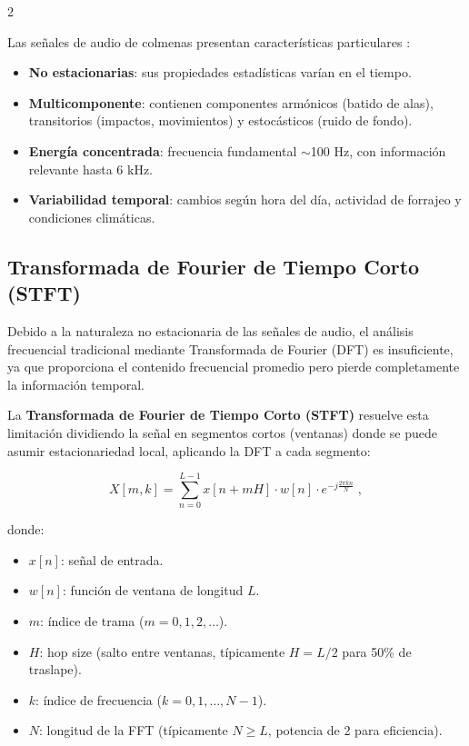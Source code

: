 \documentclass[12pt]{report}
\newenvironment{tightmulticols}{%
  \begin{multicols}{2}
  \setlength{\parskip}{1.2pt}
  \linespread{1}\selectfont
}{%
  \end{multicols}
}
\begin{document}
\begin{tightmulticols}
\noindent Las señales de audio de colmenas presentan características particulares \cite{ruvinga2023}:

\begin{itemize}
    \item \textbf{No estacionarias}: sus propiedades estadísticas varían en el tiempo.
    \item \textbf{Multicomponente}: contienen componentes armónicos (batido de alas), transitorios (impactos, movimientos) y estocásticos (ruido de fondo).
    \item \textbf{Energía concentrada}: frecuencia fundamental $\sim$100 Hz, con información relevante hasta 6 kHz.
    \item \textbf{Variabilidad temporal}: cambios según hora del día, actividad de forrajeo y condiciones climáticas.
\end{itemize}

\subsection{Transformada de Fourier de Tiempo Corto (STFT)}\label{sec:stft}

\noindent Debido a la naturaleza no estacionaria de las señales de audio, el análisis frecuencial tradicional mediante Transformada de Fourier (DFT) es insuficiente, ya que proporciona el contenido frecuencial promedio pero pierde completamente la información temporal.

\par La \textbf{Transformada de Fourier de Tiempo Corto (STFT)} resuelve esta limitación dividiendo la señal en segmentos cortos (ventanas) donde se puede asumir estacionariedad local, aplicando la DFT a cada segmento:

\begin{equation}
    X[m, k] = \sum_{n=0}^{L-1} x[n + mH] \cdot w[n] \cdot e^{-j\frac{2\pi kn}{N}} \; ,
\end{equation}

\noindent donde:
\begin{itemize}
    \item $x[n]$: señal de entrada.
    \item $w[n]$: función de ventana de longitud $L$.
    \item $m$: índice de trama ($m = 0, 1, 2, \ldots$).
    \item $H$: hop size (salto entre ventanas, típicamente $H = L/2$ para 50\% de traslape).
    \item $k$: índice de frecuencia ($k = 0, 1, \ldots, N-1$).
    \item $N$: longitud de la FFT (típicamente $N \geq L$, potencia de 2 para eficiencia).
\end{itemize}


\end{tightmulticols}
\end{document}
